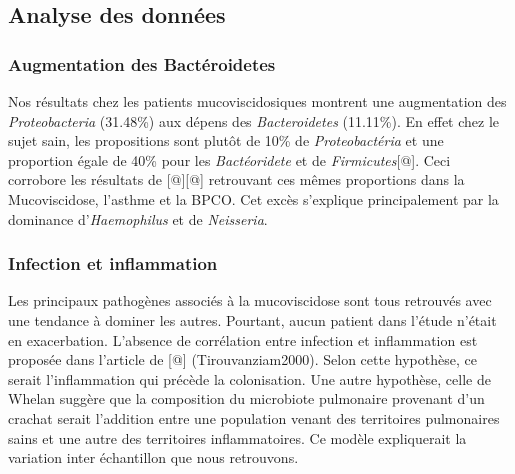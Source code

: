\documentclass[12pt,a4paper]{article}
\begin{document}

\subsection{Analyse des données}
\subsubsection{Augmentation des Bactéroidetes}
Nos résultats chez les patients mucoviscidosiques montrent une augmentation des \textit{Proteobacteria} (31.48\%) aux dépens des \textit{Bacteroidetes} (11.11\%). En effet chez le sujet sain, les propositions sont plutôt de 10\% de \textit{Proteobactéria} et une proportion égale de 40\% pour les \textit{Bactéoridete} et de \textit{Firmicutes}[@]. 
Ceci corrobore les résultats de [@][@] retrouvant ces mêmes proportions dans la Mucoviscidose, l’asthme et la BPCO. Cet excès s’explique principalement par la dominance d’\textit{Haemophilus} et de \textit{Neisseria}. 
\subsubsection{Infection et inflammation}
Les principaux pathogènes associés à la mucoviscidose sont tous retrouvés avec une tendance à dominer les autres. Pourtant, aucun patient dans l'étude n'était en exacerbation. L'absence de corrélation entre infection et inflammation est proposée dans l'article de [@] (Tirouvanziam2000). Selon cette hypothèse, ce serait l'inflammation qui précède la colonisation.  
Une autre hypothèse, celle de Whelan \cite{Whelan2015} suggère que la composition du microbiote pulmonaire provenant d'un crachat serait l'addition entre une population venant des territoires pulmonaires sains et une autre des territoires inflammatoires. Ce modèle expliquerait la variation inter échantillon que nous retrouvons. 
\end{document}
